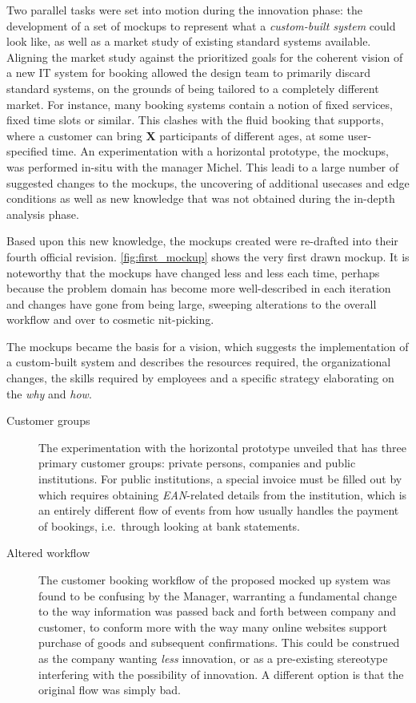 Two parallel tasks were set into motion during the innovation phase: the
development of a set of mockups to represent what a \textit{custom-built system}
could look like, as well as a market study of existing standard systems
available. Aligning the market study against the prioritized goals for the
coherent vision of a new IT system for booking allowed the design team to
primarily discard standard systems, on the grounds of being tailored to a
completely different market. For instance, many booking systems contain a notion
of fixed services, fixed time slots or similar. This clashes with the fluid
booking that \gomonkey{} supports, where a customer can bring \textbf{X}
participants of different ages, at some user-specified time. An experimentation
with a horizontal prototype, the mockups, was performed in-situ with the manager
Michel. This leadi to a large number of suggested changes to the mockups, the uncovering of
additional usecases and edge conditions as well as new knowledge that was not obtained
during the in-depth analysis phase.

Based upon this new knowledge, the mockups created were re-drafted into their
fourth official revision. \autoref{fig:first_mockup} shows the very first drawn
mockup. It is noteworthy that the mockups have changed less
and less each time, perhaps because the problem domain has become more
well-described in each iteration and changes have gone from being large,
sweeping alterations to the overall workflow and over to cosmetic nit-picking.

The mockups became the basis for a vision, which suggests the implementation of
a custom-built system and describes the resources required, the organizational
changes, the skills required by employees and a specific strategy elaborating on
the \textit{why} and \textit{how}.

\begin{description}
    \item [Customer groups] The experimentation with the horizontal prototype unveiled that 
        \gomonkey{} has three primary customer groups: private persons, companies and public
        institutions. For public institutions, a special invoice must be filled
        out by \gomonkey{} which requires obtaining \textit{EAN}-related details
        from the institution, which is an entirely different flow of events from
        how \gomonkey{} usually handles the payment of bookings, i.e.\ through
        looking at bank statements. 
    \item [Altered workflow] The customer booking workflow of the proposed mocked up 
        system was found to be confusing by the Manager, warranting a fundamental change 
        to the way information was passed back and forth between company and customer, 
        to conform more with the way many online websites support purchase of goods and 
        subsequent confirmations. This could be construed as the company wanting
        \textit{less} innovation, or as a pre-existing stereotype interfering
        with the possibility of innovation. A different option is that the
        original flow was simply bad.
\end{description}


